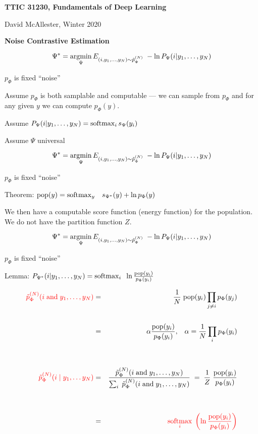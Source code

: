 





{\Huge

  \centerline{\bf TTIC 31230, Fundamentals of Deep Learning}
  \bigskip
  \centerline{David McAllester, Winter 2020}
  \vfill
  \centerline{\bf Noise Contrastive Estimation}
\vfill
\vfill


{\color{red}
$$\Psi^* = \operatorname*{argmin}_\Psi E_{(i,y_1,\ldots,y_{N}) \sim \tilde{p}_\Phi^{(N)}} \;- \ln P_\Psi(i|y_1,\ldots,y_{N})$$
\centerline{$p_\Phi$ is fixed ``noise''}
}

\vfill
Assume $p_\Phi$ is both samplable and computable --- we can sample from $p_\Phi$ and for any given $y$ we can compute $p_\Phi(y)$.

\vfill
Assume $P_\Psi(i|y_1,\ldots,y_{N}) = \operatorname*{softmax}_i s_\Psi(y_i)$

\vfill
Assume $\Psi$ universal



$$\Psi^* = \operatorname*{argmin}_\Psi E_{(i,y_1,\ldots,y_{N}) \sim \tilde{p}_\Phi^{(N)}} \;- \ln P_\Psi(i|y_1,\ldots,y_{N})$$
\centerline{$p_\Phi$ is fixed ``noise''}

\vfill
Theorem: {\color{red} $\mathrm{pop}(y) = \operatorname*{softmax}_y\;\;\; s_{\Psi^*}(y) + \ln p_\Phi(y)$}

\vfill
We then have a computable score function (energy function) for the population.  We do not have the partition function $Z$.


$$\Psi^* = \operatorname*{argmin}_\Psi E_{(i,y_1,\ldots,y_{N}) \sim \tilde{p}_\Phi^{(N)}} \;- \ln P_\Psi(i|y_1,\ldots,y_{N})$$
\centerline{$p_\Phi$ is fixed ``noise''}

\vfill
Lemma: {\color{red} $P_{\Psi^*}(i|y_1,\ldots,y_{N})  =  \operatorname*{softmax}_i\;\; \ln \frac{\mathrm{pop}(y_i)}{p_\Phi(y_i)}$}

{\huge
\begin{eqnarray*}
{\color{red} \tilde{p}_\Phi^{(N)}(i \;\mathrm{and}\;y_1,\ldots,y_{N})} & = & \frac{1}{N}\;\mathrm{pop}(y_i)\prod_{j \not = i}p_\Phi(y_j) \\
\\
& = & \alpha \frac{\mathrm{pop}(y_i)}{p_\Phi(y_i)},\;\;\;\alpha = \frac{1}{N} \prod_i p_\Phi(y_i) \\
\\
\\
{\color{red} \tilde{p}_\Phi^{(N)}(i\;|\;y_1,\ldots y_{N})} & = & \frac{\tilde{p}_\Phi^{(N)}(i\;\mbox{and} \; y_1,\ldots,y_{N})}{\sum_i \;\tilde{p}_\Phi^{(N)}(i \;\mbox{and}\; y_1,\ldots,y_{N})} \;=\;\frac{1}{Z} \;\frac{\mathrm{pop}(y_i)}{p_\Phi(y_i)} \\
\\
\\
& = & {\color{red} \operatorname*{softmax}_i\; \left(\ln \frac{\mathrm{pop}(y_i)}{p_\Phi(y_i)}\right)}
\end{eqnarray*}
}

}
